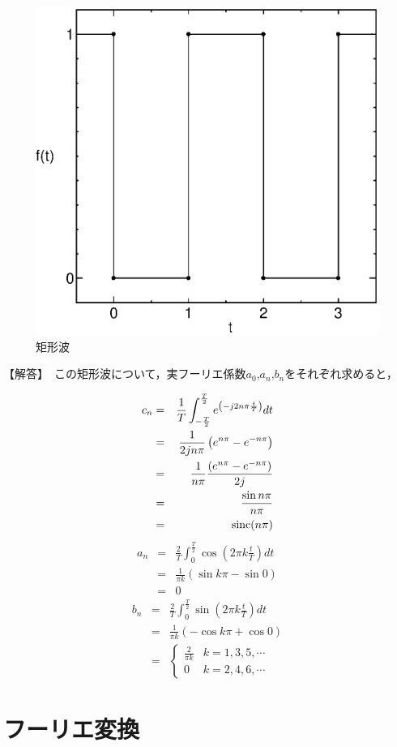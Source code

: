 \begin{figure}[H]
\begin{center}
\includegraphics[width=.35\textwidth]{fig/kukeiha.eps}
\caption{矩形波}
\label{fig:kukeiha2_6}
\end{center}
\end{figure}

【解答】　この矩形波について，実フーリエ係数$a_0$,$a_n$,$b_n$をそれぞれ求めると，

\begin{eqnarray}
c_n & = & \frac{1}{T}\int^{\frac{T}{2}}_{-\frac{T}{2}} e^{\left (-j2n \pi \frac{t}{T} \right )}dt \nonumber \\
 & = & \frac{1}{2jn\pi} \left ( e^{n \pi } - e^{-n \pi} \right )  \nonumber \\
 & = & \frac{1}{n \pi} \frac{\left ( e^{n \pi } - e^{-n \pi} \right )}{2j} \nonumber \\
 & = & \frac{\sin n \pi}{n \pi} \nonumber \\
 & = & {\rm sinc} (n\pi)
\end{eqnarray}
\begin{eqnarray}
a_n & = & \frac{2}{T}\int^{\frac{T}{2}}_{0}\cos \left( 2\pi k \frac{t}{T} \right) dt\nonumber \\
 & = & \frac{1}{\pi k} (\sin k\pi - \sin 0 ) \nonumber \\
 & = & 0
\end{eqnarray}
\begin{eqnarray}
b_n & = & \frac{2}{T}\int^{\frac{T}{2}}_{0}\sin \left( 2\pi k \frac{t}{T} \right) dt\nonumber \\
 & = & \frac{1}{\pi k} ( - \cos k\pi + \cos 0) \nonumber \\
 & = & \left \{
\begin{array}{cc}
\displaystyle \frac{2}{\pi k} & k=1,3,5,\cdots \\
0 & k=2,4,6,\cdots
\end{array}
\right .
\end{eqnarray}

\section{フーリエ変換}

